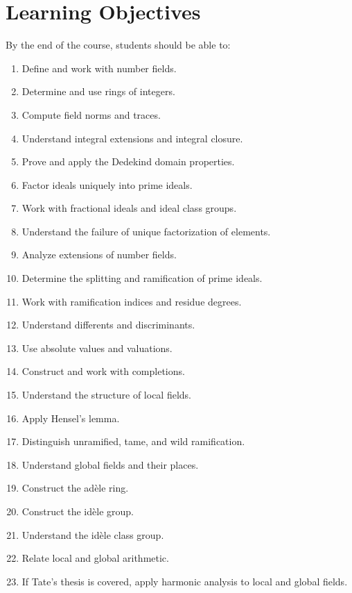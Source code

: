 \documentclass[11pt]{article}
\begin{document}
\section{Learning Objectives}

By the end of the course, students should be able to:

\begin{enumerate}
    \item Define and work with number fields.
    \item Determine and use rings of integers.
    \item Compute field norms and traces.
    \item Understand integral extensions and integral closure.
    \item Prove and apply the Dedekind domain properties.
    \item Factor ideals uniquely into prime ideals.
    \item Work with fractional ideals and ideal class groups.
    \item Understand the failure of unique factorization of elements.
    \item Analyze extensions of number fields.
    \item Determine the splitting and ramification of prime ideals.
    \item Work with ramification indices and residue degrees.
    \item Understand differents and discriminants.
    \item Use absolute values and valuations.
    \item Construct and work with completions.
    \item Understand the structure of local fields.
    \item Apply Hensel's lemma.
    \item Distinguish unramified, tame, and wild ramification.
    \item Understand global fields and their places.
    \item Construct the adèle ring.
    \item Construct the idèle group.
    \item Understand the idèle class group.
    \item Relate local and global arithmetic.
    \item If Tate's thesis is covered, apply harmonic analysis
          to local and global fields.
\end{enumerate}
\end{document}
